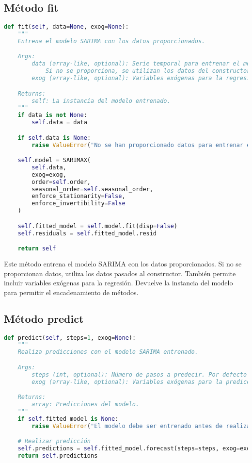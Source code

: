 \documentclass[12pt,letterpaper]{report}
\begin{document}
\subsection{Método fit}
\begin{lstlisting}[language=python]
def fit(self, data=None, exog=None):
    """
    Entrena el modelo SARIMA con los datos proporcionados.

    Args:
        data (array-like, optional): Serie temporal para entrenar el modelo.
            Si no se proporciona, se utilizan los datos del constructor.
        exog (array-like, optional): Variables exógenas para la regresión.

    Returns:
        self: La instancia del modelo entrenado.
    """
    if data is not None:
        self.data = data

    if self.data is None:
        raise ValueError("No se han proporcionado datos para entrenar el modelo")

    self.model = SARIMAX(
        self.data,
        exog=exog,
        order=self.order,
        seasonal_order=self.seasonal_order,
        enforce_stationarity=False,
        enforce_invertibility=False
    )

    self.fitted_model = self.model.fit(disp=False)
    self.residuals = self.fitted_model.resid

    return self
\end{lstlisting}

Este método entrena el modelo SARIMA con los datos proporcionados. Si no se proporcionan datos, utiliza los datos pasados al constructor. También permite incluir variables exógenas para la regresión. Devuelve la instancia del modelo para permitir el encadenamiento de métodos.

\subsection{Método predict}
\begin{lstlisting}[language=python]
def predict(self, steps=1, exog=None):
    """
    Realiza predicciones con el modelo SARIMA entrenado.

    Args:
        steps (int, optional): Número de pasos a predecir. Por defecto es 1.
        exog (array-like, optional): Variables exógenas para la predicción.

    Returns:
        array: Predicciones del modelo.
    """
    if self.fitted_model is None:
        raise ValueError("El modelo debe ser entrenado antes de realizar predicciones")

    # Realizar predicción
    self.predictions = self.fitted_model.forecast(steps=steps, exog=exog)
    return self.predictions
\end{lstlisting}
\end{document}
